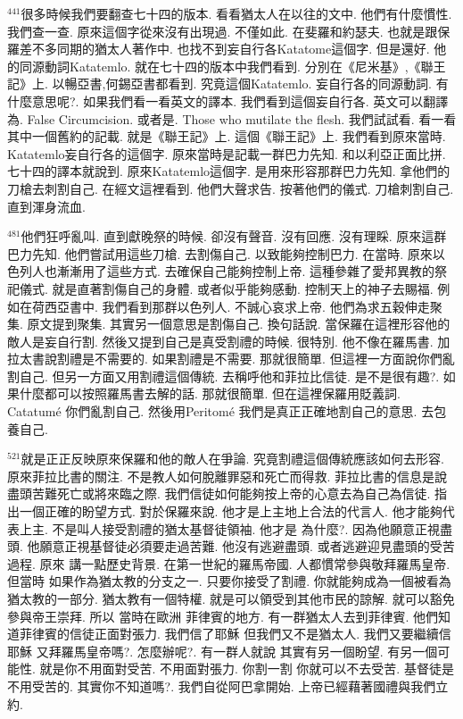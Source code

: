 \documentclass{book}
\begin{document}
$^{441}$很多時候我們要翻查七十四的版本.
看看猶太人在以往的文中.
他們有什麼慣性.
我們查一查.
原來這個字從來沒有出現過.
不僅如此.
在斐羅和約瑟夫.
也就是跟保羅差不多同期的猶太人著作中.
也找不到妄自行各Katatome這個字.
但是還好.
他的同源動詞Katatemlo.
就在七十四的版本中我們看到.
分別在《尼米基》,《聯王記》上.
以暢亞書,何錫亞書都看到.
究竟這個Katatemlo.
妄自行各的同源動詞.
有什麼意思呢?.
如果我們看一看英文的譯本.
我們看到這個妄自行各.
英文可以翻譯為.
False Circumcision.
或者是.
Those who mutilate the flesh.
我們試試看.
看一看其中一個舊約的記載.
就是《聯王記》上.
這個《聯王記》上.
我們看到原來當時.
Katatemlo妄自行各的這個字.
原來當時是記載一群巴力先知.
和以利亞正面比拼.
七十四的譯本就說到.
原來Katatemlo這個字.
是用來形容那群巴力先知.
拿他們的刀槍去刺割自己.
在經文這裡看到.
他們大聲求告.
按著他們的儀式.
刀槍刺割自己.
直到渾身流血.

$^{481}$他們狂呼亂叫.
直到獻晚祭的時候.
卻沒有聲音.
沒有回應.
沒有理睬.
原來這群巴力先知.
他們嘗試用這些刀槍.
去割傷自己.
以致能夠控制巴力.
在當時.
原來以色列人也漸漸用了這些方式.
去確保自己能夠控制上帝.
這種參雜了愛邦異教的祭祀儀式.
就是直著割傷自己的身體.
或者似乎能夠感動.
控制天上的神子去賜福.
例如在荷西亞書中.
我們看到那群以色列人.
不誠心哀求上帝.
他們為求五穀伸走聚集.
原文提到聚集.
其實另一個意思是割傷自己.
換句話說.
當保羅在這裡形容他的敵人是妄自行割.
然後又提到自己是真受割禮的時候.
很特別.
他不像在羅馬書.
加拉太書說割禮是不需要的.
如果割禮是不需要.
那就很簡單.
但這裡一方面說你們亂割自己.
但另一方面又用割禮這個傳統.
去稱呼他和菲拉比信徒.
是不是很有趣?.
如果什麼都可以按照羅馬書去解的話.
那就很簡單.
但在這裡保羅用貶義詞.
Catatumé 你們亂割自己.
然後用Peritomé 我們是真正正確地割自己的意思.
去包養自己.

$^{521}$就是正正反映原來保羅和他的敵人在爭論.
究竟割禮這個傳統應該如何去形容.
原來菲拉比書的關注.
不是教人如何脫離罪惡和死亡而得救.
菲拉比書的信息是說盡頭苦難死亡或將來臨之際.
我們信徒如何能夠按上帝的心意去為自己為信徒.
指出一個正確的盼望方式.
對於保羅來說.
他才是上主地上合法的代言人.
他才能夠代表上主.
不是叫人接受割禮的猶太基督徒領袖.
他才是 為什麼?.
因為他願意正視盡頭.
他願意正視基督徒必須要走過苦難.
他沒有逃避盡頭.
或者逃避迎見盡頭的受苦過程.
原來 講一點歷史背景.
在第一世紀的羅馬帝國.
人都慣常參與敬拜羅馬皇帝.
但當時 如果作為猶太教的分支之一.
只要你接受了割禮.
你就能夠成為一個被看為猶太教的一部分.
猶太教有一個特權.
就是可以領受到其他市民的諒解.
就可以豁免參與帝王崇拜.
所以 當時在歐洲 菲律賓的地方.
有一群猶太人去到菲律賓.
他們知道菲律賓的信徒正面對張力.
我們信了耶穌 但我們又不是猶太人.
我們又要繼續信耶穌 又拜羅馬皇帝嗎?.
怎麼辦呢?.
有一群人就說 其實有另一個盼望.
有另一個可能性.
就是你不用面對受苦.
不用面對張力.
你割一割 你就可以不去受苦.
基督徒是不用受苦的.
其實你不知道嗎?.
我們自從阿巴拿開始.
上帝已經藉著國禮與我們立約.
\end{document}
